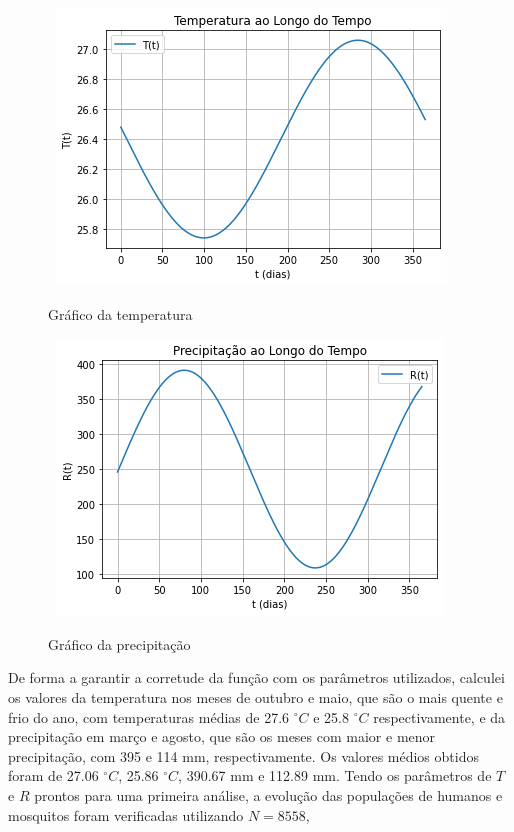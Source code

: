 \begin{figure}[!ht]
        \centering
        \hbox{\hspace{7.2em} \includegraphics[scale=0.6] {Grafico_da_Temperatura.png}}
        \caption{Gráfico da temperatura}
\end{figure} 
\newpage
\begin{figure}[!ht]
        \centering
        \hbox{\hspace{7.5em} \includegraphics[scale=0.6] {Grafico_da_Precipitacao.png}}
        \caption{Gráfico da precipitação}
\end{figure} 
De forma a garantir a corretude da função com os parâmetros utilizados, calculei os valores da temperatura nos meses de outubro e maio, 
que são o mais quente e frio do ano, com temperaturas médias de 27.6 $^\circ C$ e 25.8 $^\circ C$ respectivamente, e da precipitação em 
março e agosto, que são os meses com maior e menor precipitação, com 395 e 114 mm, respectivamente. Os valores médios obtidos foram de 
27.06 $^\circ C$, 25.86 $^\circ C$, 390.67 mm e 112.89 mm. Tendo os parâmetros de $T$ e $R$ prontos para uma primeira análise, a evolução 
das populações de humanos e mosquitos foram verificadas utilizando $N=8558$, 
